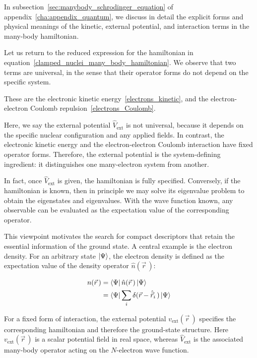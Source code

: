 In subsection~\ref{sec:manybody_schrodinger_equation} of appendix~\ref{cha:appendix_quantum},
we discuss in detail the explicit forms and physical meanings of the kinetic, external potential, and interaction terms in the many-body hamiltonian.

Let us return to the reduced expression for the hamiltonian in equation~\eqref{clamped_nuclei_many_body_hamiltonian}.
We observe that two terms are universal, in the sense that their operator forms do not depend on the specific system.

These are the electronic kinetic energy~\eqref{electrons_kinetic},
and the electron-electron Coulomb repulsion~\eqref{electrons_Coulomb}.

Here, we say the external potential $\hat{V}_\mathrm{ext}$ is not universal, because it depends on the specific nuclear configuration and any applied fields. In contrast, the electronic kinetic energy and the electron-electron Coulomb interaction have fixed operator forms.
Therefore, the external potential is the system-defining ingredient: it distinguishes one many-electron system from another.

In fact, once $\hat{V}_\mathrm{ext}$ is given, the hamiltonian is fully specified.
Conversely, if the hamiltonian is known, then in principle we may solve its eigenvalue problem to obtain the eigenstates and eigenvalues.
With the wave function known, any observable can be evaluated as the expectation value of the corresponding operator.

This viewpoint motivates the search for compact descriptors that retain the essential information of the ground state.
A central example is the electron density.
For an arbitrary state $\ket{\Psi}$, the electron density is defined as the expectation value of the density operator $\hat{n}(\vec{r}\,)$:

\begin{equation}
\begin{aligned}
   n(\vec{r}\,)&=\bra{\Psi}\hat{n}(\vec{r}\,)\ket{\Psi} \\
   &=\bra{\Psi}\sum_i \delta(\vec{r}-\hat{\vec{r}}_i\,)\ket{\Psi}
\end{aligned}
\label{electron_densit_via_expectation}
\end{equation}

For a fixed form of interaction, the external potential $v_\mathrm{ext}(\vec{r}\,)$ specifies the corresponding hamiltonian and therefore the ground-state structure.
Here $v_\mathrm{ext}(\vec{r}\,)$ is a scalar potential field in real space, whereas $\hat{V}_\mathrm{ext}$ is the associated many-body operator acting on the $N$-electron wave function.


